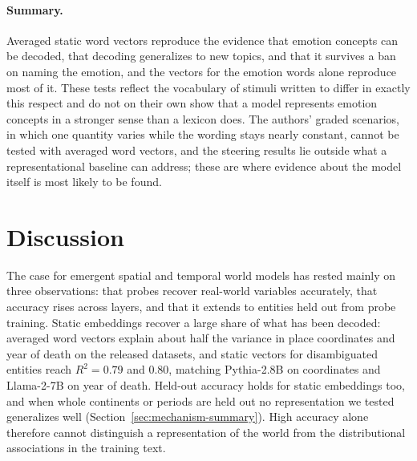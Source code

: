 \documentclass[11pt]{article}
\begin{document}
\paragraph{Summary.}
Averaged static word vectors reproduce the evidence that emotion concepts can be decoded, that
decoding generalizes to new topics, and that it survives a ban on naming the emotion, and the
vectors for the emotion words alone reproduce most of it. These tests reflect the vocabulary of
stimuli written to differ in exactly this respect and do not on their own show
that a model represents emotion concepts in a stronger sense than a lexicon does. The authors'
graded scenarios, in which one quantity varies while the wording stays
nearly constant, cannot be tested with averaged word vectors, and the steering results lie
outside what a representational baseline can address; these are where evidence about the model
itself is most likely to be found.

\section{Discussion}
\label{sec:discussion}

The case for emergent spatial and temporal world models has rested mainly on three observations: that probes recover real-world variables accurately, that accuracy rises across layers, and that it extends to entities held out from probe training. Static embeddings recover a large share of what has been decoded: averaged word vectors explain about half the variance in place coordinates and year of death on the released datasets, and static vectors for disambiguated entities reach $R^2 = 0.79$ and $0.80$, matching Pythia-2.8B on coordinates and Llama-2-7B on year of death. Held-out accuracy holds for static embeddings too, and when whole continents or periods are held out no representation we tested generalizes well (Section~\ref{sec:mechanism-summary}). High accuracy alone therefore cannot distinguish a representation of the world from the distributional associations in the training text.
\end{document}
